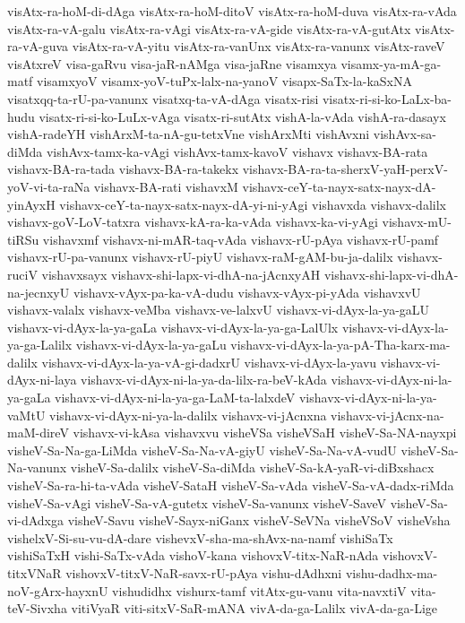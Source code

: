 {visAtx-ra-hoM-di-dAga
visAtx-ra-hoM-ditoV
visAtx-ra-hoM-duva
visAtx-ra-vAda
visAtx-ra-vA-galu
visAtx-ra-vAgi
visAtx-ra-vA-gide
visAtx-ra-vA-gutAtx
visAtx-ra-vA-guva
visAtx-ra-vA-yitu
visAtx-ra-vanUnx
visAtx-ra-vanunx
visAtx-raveV
visAtxreV
visa-gaRvu
visa-jaR-nAMga
visa-jaRne
visamxya
visamx-ya-mA-ga-matf
visamxyoV
visamx-yoV-tuPx-lalx-na-yanoV
visapx-SaTx-la-kaSxNA
visatxqq-ta-rU-pa-vanunx
visatxq-ta-vA-dAga
visatx-risi
visatx-ri-si-ko-LaLx-ba-hudu
visatx-ri-si-ko-LuLx-vAga
visatx-ri-sutAtx
vishA-la-vAda
vishA-ra-dasayx
vishA-radeYH
vishArxM-ta-nA-gu-tetxVne
vishArxMti
vishAvxni
vishAvx-sa-diMda
vishAvx-tamx-ka-vAgi
vishAvx-tamx-kavoV
vishavx
vishavx-BA-rata
vishavx-BA-ra-tada
vishavx-BA-ra-takekx
vishavx-BA-ra-ta-sherxV-yaH-perxV-yoV-vi-ta-raNa
vishavx-BA-rati
vishavxM
vishavx-ceY-ta-nayx-satx-nayx-dA-yinAyxH
vishavx-ceY-ta-nayx-satx-nayx-dA-yi-ni-yAgi
vishavxda
vishavx-dalilx
vishavx-goV-LoV-tatxra
vishavx-kA-ra-ka-vAda
vishavx-ka-vi-yAgi
vishavx-mU-tiRSu
vishavxmf
vishavx-ni-mAR-taq-vAda
vishavx-rU-pAya
vishavx-rU-pamf
vishavx-rU-pa-vanunx
vishavx-rU-piyU
vishavx-raM-gAM-bu-ja-dalilx
vishavx-ruciV
vishavxsayx
vishavx-shi-lapx-vi-dhA-na-jAcnxyAH
vishavx-shi-lapx-vi-dhA-na-jecnxyU
vishavx-vAyx-pa-ka-vA-dudu
vishavx-vAyx-pi-yAda
vishavxvU
vishavx-valalx
vishavx-veMba
vishavx-ve-lalxvU
vishavx-vi-dAyx-la-ya-gaLU
vishavx-vi-dAyx-la-ya-gaLa
vishavx-vi-dAyx-la-ya-ga-LalUlx
vishavx-vi-dAyx-la-ya-ga-Lalilx
vishavx-vi-dAyx-la-ya-gaLu
vishavx-vi-dAyx-la-ya-pA-Tha-karx-ma-dalilx
vishavx-vi-dAyx-la-ya-vA-gi-dadxrU
vishavx-vi-dAyx-la-yavu
vishavx-vi-dAyx-ni-laya
vishavx-vi-dAyx-ni-la-ya-da-lilx-ra-beV-kAda
vishavx-vi-dAyx-ni-la-ya-gaLa
vishavx-vi-dAyx-ni-la-ya-ga-LaM-ta-lalxdeV
vishavx-vi-dAyx-ni-la-ya-vaMtU
vishavx-vi-dAyx-ni-ya-la-dalilx
vishavx-vi-jAcnxna
vishavx-vi-jAcnx-na-maM-direV
vishavx-vi-kAsa
vishavxvu
visheVSa
visheVSaH
visheV-Sa-NA-nayxpi
visheV-Sa-Na-ga-LiMda
visheV-Sa-Na-vA-giyU
visheV-Sa-Na-vA-vudU
visheV-Sa-Na-vanunx
visheV-Sa-dalilx
visheV-Sa-diMda
visheV-Sa-kA-yaR-vi-diBxshacx
visheV-Sa-ra-hi-ta-vAda
visheV-SataH
visheV-Sa-vAda
visheV-Sa-vA-dadx-riMda
visheV-Sa-vAgi
visheV-Sa-vA-gutetx
visheV-Sa-vanunx
visheV-SaveV
visheV-Sa-vi-dAdxga
visheV-Savu
visheV-Sayx-niGanx
visheV-SeVNa
visheVSoV
visheVsha
vishelxV-Si-su-vu-dA-dare
vishevxV-sha-ma-shAvx-na-namf
vishiSaTx
vishiSaTxH
vishi-SaTx-vAda
vishoV-kana
vishovxV-titx-NaR-nAda
vishovxV-titxVNaR
vishovxV-titxV-NaR-savx-rU-pAya
vishu-dAdhxni
vishu-dadhx-ma-noV-gArx-hayxnU
vishudidhx
vishurx-tamf
vitAtx-gu-vanu
vita-navxtiV
vita-teV-Sivxha
vitiVyaR
viti-sitxV-SaR-mANA
vivA-da-ga-Lalilx
vivA-da-ga-Lige
}
